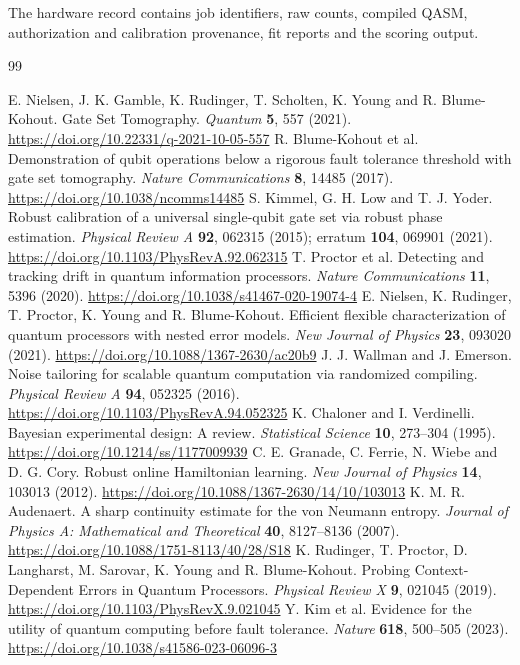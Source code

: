 \documentclass[11pt,a4paper]{article}
\begin{document}
The hardware record contains job identifiers, raw counts, compiled QASM, authorization and calibration provenance, fit reports and the scoring output.

\begin{thebibliography}{99}

 E. Nielsen, J. K. Gamble, K. Rudinger, T. Scholten, K. Young and R. Blume-Kohout. Gate Set Tomography. \emph{Quantum} \textbf{5}, 557 (2021). \url{https://doi.org/10.22331/q-2021-10-05-557}
 R. Blume-Kohout et al. Demonstration of qubit operations below a rigorous fault tolerance threshold with gate set tomography. \emph{Nature Communications} \textbf{8}, 14485 (2017). \url{https://doi.org/10.1038/ncomms14485}
 S. Kimmel, G. H. Low and T. J. Yoder. Robust calibration of a universal single-qubit gate set via robust phase estimation. \emph{Physical Review A} \textbf{92}, 062315 (2015); erratum \textbf{104}, 069901 (2021). \url{https://doi.org/10.1103/PhysRevA.92.062315}
 T. Proctor et al. Detecting and tracking drift in quantum information processors. \emph{Nature Communications} \textbf{11}, 5396 (2020). \url{https://doi.org/10.1038/s41467-020-19074-4}
 E. Nielsen, K. Rudinger, T. Proctor, K. Young and R. Blume-Kohout. Efficient flexible characterization of quantum processors with nested error models. \emph{New Journal of Physics} \textbf{23}, 093020 (2021). \url{https://doi.org/10.1088/1367-2630/ac20b9}
 J. J. Wallman and J. Emerson. Noise tailoring for scalable quantum computation via randomized compiling. \emph{Physical Review A} \textbf{94}, 052325 (2016). \url{https://doi.org/10.1103/PhysRevA.94.052325}
 K. Chaloner and I. Verdinelli. Bayesian experimental design: A review. \emph{Statistical Science} \textbf{10}, 273--304 (1995). \url{https://doi.org/10.1214/ss/1177009939}
 C. E. Granade, C. Ferrie, N. Wiebe and D. G. Cory. Robust online Hamiltonian learning. \emph{New Journal of Physics} \textbf{14}, 103013 (2012). \url{https://doi.org/10.1088/1367-2630/14/10/103013}
 K. M. R. Audenaert. A sharp continuity estimate for the von Neumann entropy. \emph{Journal of Physics A: Mathematical and Theoretical} \textbf{40}, 8127--8136 (2007). \url{https://doi.org/10.1088/1751-8113/40/28/S18}
 K. Rudinger, T. Proctor, D. Langharst, M. Sarovar, K. Young and R. Blume-Kohout. Probing Context-Dependent Errors in Quantum Processors. \emph{Physical Review X} \textbf{9}, 021045 (2019). \url{https://doi.org/10.1103/PhysRevX.9.021045}
 Y. Kim et al. Evidence for the utility of quantum computing before fault tolerance. \emph{Nature} \textbf{618}, 500--505 (2023). \url{https://doi.org/10.1038/s41586-023-06096-3}

\end{thebibliography}
\end{document}
